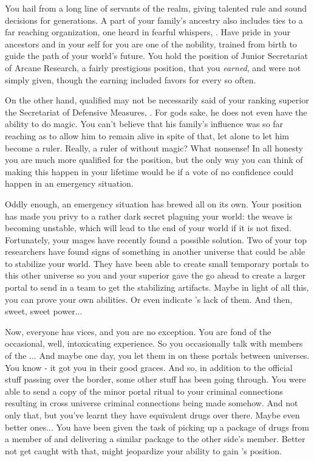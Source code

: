 \documentclass[char]{guildcamp3}
\begin{document}
	
	

\name{\cNobleTwo{}}


You hail from a long line of servants of the realm, giving talented rule and sound decisions for generations. A part of your family's ancestry also includes ties to a far reaching organization, one heard in fearful whispers, \bMagicMob{}. Have pride in your ancestors and in your self for you are one of the nobility, trained from birth to guide the path of your world's future. You hold the position of Junior Secretariat of Arcane Research, a fairly prestigious position, that you \emph{earned}, and were not simply given, though the earning included favors for \bMagicMob{} every so often. 

On the other hand, qualified may not be necessarily said of your ranking superior the Secretariat of Defensive Measures, \cNobleOne{\intro}. For gods sake, he does not even have the ability to do magic. You can't believe that his family's influence was so far reaching as to allow him to remain alive in spite of that, let alone to let him become a ruler. Really, a ruler of \bMagicWorld{} without magic? What nonsense! In all honesty you are much more qualified for the position, but the only way you can think of making this happen in your lifetime would be if a vote of no confidence could happen in an emergency situation. 

Oddly enough, an emergency situation has brewed all on its own. Your position has made you privy to a rather dark secret plaguing your world: the weave is becoming unstable, which will lead to the end of your world if it is not fixed. Fortunately, your mages have recently found a possible solution. Two of your top researchers have found signs of something in another universe that could be able to stabilize your world. They have been able to create small temporary portals to this other universe so you and your superior gave the go ahead to create a larger portal to send in a team to get the stabilizing artifacts. Maybe in light of all this, you can prove your own abilities. Or even indicate \cNobleOne{}'s lack of them. And then, sweet, sweet power...

Now, everyone has vices, and you are no exception. You are fond of the occasional, well, intoxicating experience. So you occasionally talk with members of the \bTechMob{}... And maybe one day, you let them in on these portals between universes. You know - it got you in their good graces. And so, in addition to the official stuff passing over the border, some other stuff has been going through. You were able to send a copy of the minor portal ritual to your criminal connections resulting in cross universe criminal connections being made somehow. And not only that, but you've learnt they have equivalent drugs over there. Maybe even better ones... You have been given the task of picking up a package of drugs from a member of \bTechMob{} and delivering a similar package to the other side's member. Better not get caught with that, might jeopardize your ability to gain \cNobleOne{}'s position.
\end{document}

